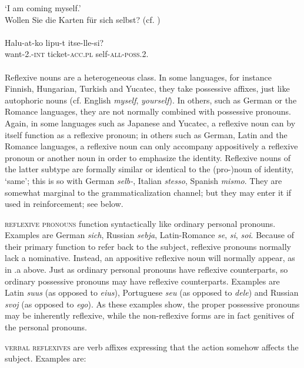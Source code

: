 \glt ‘I am coming myself.’\\
\ex 
Wollen Sie die Karten für sich selbst?  {\upshape (cf. )}\\
\z
\z
\noindent \ea\label{ex:E15}
\langinfo{\LangFinn}{}{}\\
\gll Halu-at-ko  lipu-t  itse-lle-si?\\
 want-2.\glsg-\textsc{int}  ticket-\textsc{acc}.\textsc{pl}  self-\textsc{all}-\textsc{poss}.2.\glsg\\
\\
\z
\noindent 
Reflexive nouns are a heterogeneous class. In some languages, for instance Finnish, Hungarian, Turkish and Yucatec, they take possessive affixes, just like autophoric nouns (cf. English \textit{myself}, \textit{yourself}). In others, such as German or the Romance languages, they are not normally combined with possessive pronouns. Again, in some languages such as Japanese and Yucatec, a reflexive noun can by itself function as a reflexive pronoun; in others such as German, Latin and the Romance languages, a reflexive noun can only accompany appositively a reflexive pronoun or another noun in order to emphasize the identity. Reflexive nouns of the latter subtype are formally similar or identical to the (pro-)noun of identity, ‘same’; this is so with German \textit{selb-}, Italian \textit{stesso}, Spanish \textit{mismo}. They are somewhat marginal to the grammaticalization channel; but they may enter it if used in reinforcement; see below.

\textsc{reflexive pronouns} function syntactically like ordinary personal pronouns. Examples are German \textit{sich}, Russian \textit{sebja}, Latin-Romance \textit{se}, \textit{si}, \textit{soi}. Because of their primary function to refer back to the subject, reflexive pronouns normally lack a nominative. Instead, an appositive reflexive noun will normally appear, as in .a above. Just as ordinary personal pronouns have reflexive counterparts, so ordinary possessive pronouns may have reflexive counterparts. Examples are Latin \textit{suus} (as opposed to \textit{eius}), Portuguese \textit{seu} (as opposed to \textit{dele}) and Russian \textit{svoj} (as opposed to \textit{ego}). As these examples show, the proper possessive pronouns may be inherently reflexive, while the non-reflexive forms are in fact genitives of the personal pronouns.

\textsc{verbal reflexives} are verb affixes expressing that the action somehow affects the subject. Examples are:

